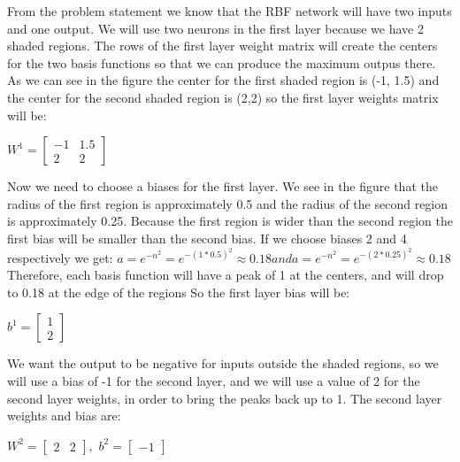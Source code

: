\documentclass{article}
\begin{document}
\noindent From the problem statement we know that the RBF network will have two inputs and one output.
We will use two neurons in the first layer because we have 2 shaded regions. 
The rows of the first layer weight matrix
will create the centers for the two basis functions so that we can produce the maximum outpus there. 
As we can see in the figure the center for the first shaded region
is (-1, 1.5) and the center for the second shaded region is (2,2) so the first layer weights matrix will be: \\
\begin{center}
  
$ W^1 = \begin{bmatrix}
  - 1 & 1.5 \\
  2 & 2
\end{bmatrix} $
\end{center}

\noindent Now we need to choose a biases for the first layer. We see in the figure that the radius of the first 
region is approximately 0.5 and the radius of the second region is approximately 0.25. 
Because the first region is wider than the second region the first bias will be smaller than the second bias.
If we choose biases 2 and 4 respectively we get:
$a = e^{-n^2}= e^{-(1*0.5)^2} \approx 0.18 and a = e^{-n^2}= e^{-(2*0.25)^2} \approx 0.18$
Therefore, each basis function will have a peak of 1 at the centers, and will drop to 0.18 at the edge of the regions
So the first layer bias will be:
\begin{center}
  
  $ b^1 = \begin{bmatrix}
    1 \\
    2 
  \end{bmatrix} $
  \end{center}

  \noindent We want the output to be negative for inputs outside the shaded regions,
  so we will use a bias of -1 for the second layer, and we will use a value of 2
  for the second layer weights, in order to bring the peaks back up to 1. The second layer weights and bias are:

  \begin{center}
  
    $ W^2 = \begin{bmatrix}
      2 & 2
    \end{bmatrix},
     $
    $ b^2 = \begin{bmatrix}
      -1
    \end{bmatrix} $

    \end{center}
  
\end{document}
